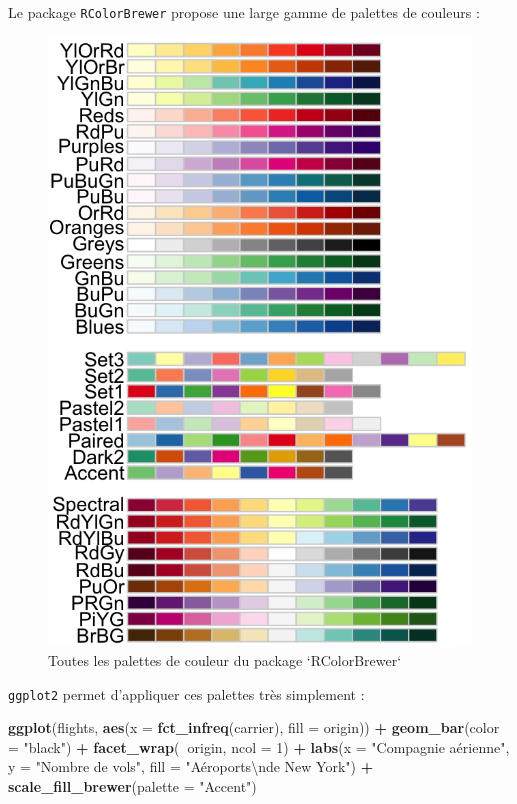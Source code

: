 \documentclass[a4paperpaper,]{article}
\newenvironment{Shaded}{\begin{snugshade}}{\end{snugshade}}
\newcommand{\KeywordTok}[1]{\textcolor[rgb]{0.13,0.29,0.53}{\textbf{#1}}}
\newcommand{\DataTypeTok}[1]{\textcolor[rgb]{0.13,0.29,0.53}{#1}}
\newcommand{\DecValTok}[1]{\textcolor[rgb]{0.00,0.00,0.81}{#1}}
\newcommand{\CharTok}[1]{\textcolor[rgb]{0.31,0.60,0.02}{#1}}
\newcommand{\StringTok}[1]{\textcolor[rgb]{0.31,0.60,0.02}{#1}}
\newcommand{\OperatorTok}[1]{\textcolor[rgb]{0.81,0.36,0.00}{\textbf{#1}}}
\newcommand{\NormalTok}[1]{#1}
\theoremstyle{definition}
\theoremstyle{definition}
\theoremstyle{definition}
\theoremstyle{remark}
\begin{document}
Le package \texttt{RColorBrewer} propose une large gamme de palettes de
couleurs :

\begin{figure}[htpb]

{\centering \includegraphics[width=0.5\linewidth]{images/brewer} 

}

\caption{Toutes les palettes de couleur du package `RColorBrewer`}\label{fig:RcolorbrewerPalettes}
\end{figure}

\texttt{ggplot2} permet d'appliquer ces palettes très simplement :

\begin{Shaded}
\begin{Highlighting}[]
\KeywordTok{ggplot}\NormalTok{(flights, }\KeywordTok{aes}\NormalTok{(}\DataTypeTok{x =} \KeywordTok{fct_infreq}\NormalTok{(carrier), }\DataTypeTok{fill =}\NormalTok{ origin)) }\OperatorTok{+}
\StringTok{  }\KeywordTok{geom_bar}\NormalTok{(}\DataTypeTok{color =} \StringTok{"black"}\NormalTok{) }\OperatorTok{+}
\StringTok{  }\KeywordTok{facet_wrap}\NormalTok{(}\OperatorTok{~}\NormalTok{origin, }\DataTypeTok{ncol =} \DecValTok{1}\NormalTok{) }\OperatorTok{+}
\StringTok{  }\KeywordTok{labs}\NormalTok{(}\DataTypeTok{x =} \StringTok{"Compagnie aérienne"}\NormalTok{,}
       \DataTypeTok{y =} \StringTok{"Nombre de vols"}\NormalTok{,}
       \DataTypeTok{fill =} \StringTok{"Aéroports}\CharTok{\textbackslash{}n}\StringTok{de New York"}\NormalTok{) }\OperatorTok{+}
\StringTok{  }\KeywordTok{scale_fill_brewer}\NormalTok{(}\DataTypeTok{palette =} \StringTok{"Accent"}\NormalTok{)}
\end{Highlighting}
\end{Shaded}
\end{document}
